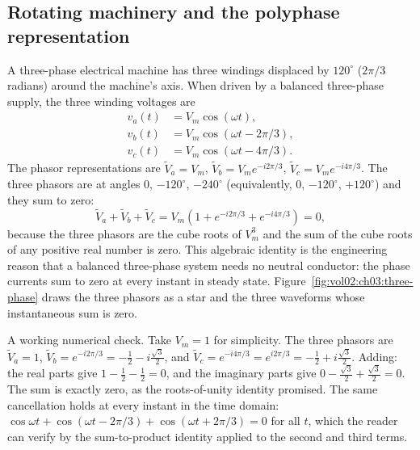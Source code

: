 

\subsection{Rotating machinery and the polyphase representation}

A three-phase electrical machine has three windings displaced by
$120^{\circ}$ ($2\pi/3$ radians) around the machine's axis. When
driven by a balanced three-phase supply, the three winding
voltages are
\begin{align*}
v_{a}(t) &= V_{m}\cos(\omega t), \\
v_{b}(t) &= V_{m}\cos(\omega t - 2\pi/3), \\
v_{c}(t) &= V_{m}\cos(\omega t - 4\pi/3).
\end{align*}
The phasor representations are $\tilde{V}_{a} = V_{m}$,
$\tilde{V}_{b} = V_{m} e^{-i2\pi/3}$, $\tilde{V}_{c} = V_{m}
e^{-i4\pi/3}$. The three phasors are at angles $0$, $-120^{\circ}$,
$-240^{\circ}$ (equivalently, $0$, $-120^{\circ}$, $+120^{\circ}$)
and they sum to zero:
\[
\tilde{V}_{a} + \tilde{V}_{b} + \tilde{V}_{c} = V_{m}\left(1 + e^{-i2\pi/3} + e^{-i4\pi/3}\right) = 0,
\]
because the three phasors are the cube roots of $V_{m}^{3}$ and
the sum of the cube roots of any positive real number is zero.
This algebraic identity is the engineering reason that a balanced
three-phase system needs no neutral conductor: the phase currents
sum to zero at every instant in steady state.
Figure~\ref{fig:vol02:ch03:three-phase} draws the three phasors as a
star and the three waveforms whose instantaneous sum is zero.



A working numerical check. Take $V_{m} = 1$ for simplicity. The
three phasors are $\tilde V_{a} = 1$, $\tilde V_{b} = e^{-i2\pi/3} =
-\tfrac{1}{2} - i\tfrac{\sqrt 3}{2}$, and $\tilde V_{c} =
e^{-i4\pi/3} = e^{i2\pi/3} = -\tfrac{1}{2} + i\tfrac{\sqrt 3}{2}$.
Adding: the real parts give $1 - \tfrac{1}{2} - \tfrac{1}{2} = 0$,
and the imaginary parts give $0 - \tfrac{\sqrt 3}{2} + \tfrac{\sqrt
3}{2} = 0$. The sum is exactly zero, as the roots-of-unity identity
promised. The same cancellation holds at every instant in the time
domain: $\cos\omega t + \cos(\omega t - 2\pi/3) + \cos(\omega t +
2\pi/3) = 0$ for all $t$, which the reader can verify by the
sum-to-product identity applied to the second and third terms.

